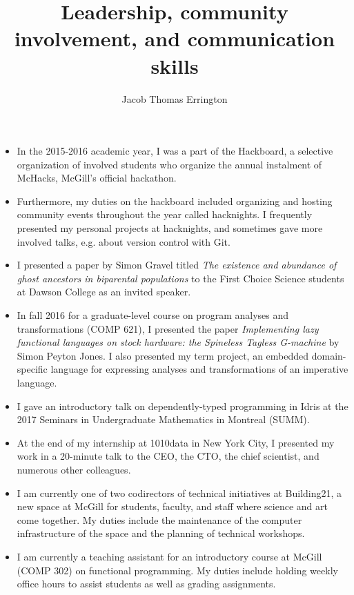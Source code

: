 \documentclass[11pt,letterpaper]{article}
\author{Jacob Thomas Errington}
\title{Leadership, community involvement, and communication skills}
\date{}
\begin{document}
\maketitle

\begin{itemize}
  \item
    In the 2015-2016 academic year, I was a part of the Hackboard, a selective
    organization of involved students who organize the annual instalment of
    McHacks, McGill's official hackathon.

  \item
    Furthermore, my duties on the hackboard included organizing and hosting
    community events throughout the year called hacknights. I frequently
    presented my personal projects at hacknights, and sometimes gave more
    involved talks, e.g. about version control with Git.

  \item
    I presented a paper by Simon Gravel titled \textit{The existence and
    abundance of ghost ancestors in biparental populations} to the First Choice
    Science students at Dawson College as an invited speaker.

  \item
    In fall 2016 for a graduate-level course on program analyses and
    transformations (COMP 621), I presented the paper \textit{Implementing lazy
    functional languages on stock hardware: the Spineless Tagless G-machine} by
    Simon Peyton Jones. I also presented my term project, an embedded
    domain-specific language for expressing analyses and transformations of an
    imperative language.

  \item
    I gave an introductory talk on dependently-typed programming in Idris at
    the 2017 Seminars in Undergraduate Mathematics in Montreal (SUMM).

  \item
    At the end of my internship at 1010data in New York City, I presented my
    work in a 20-minute talk to the CEO, the CTO, the chief scientist, and
    numerous other colleagues.

  \item
    I am currently one of two codirectors of technical initiatives at
    Building21, a new space at McGill for students, faculty, and staff where
    science and art come together. My duties include the maintenance of the
    computer infrastructure of the space and the planning of technical
    workshops.

  \item
    I am currently a teaching assistant for an introductory course at McGill
    (COMP 302) on functional programming. My duties include holding weekly
    office hours to assist students as well as grading assignments.
\end{itemize}
\end{document}
